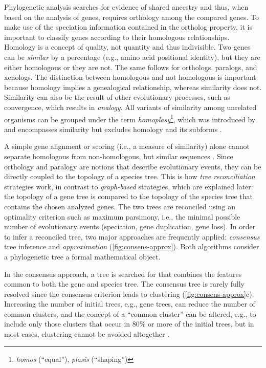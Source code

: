 Phylogenetic analysis searches for evidence of shared ancestry and thus, when
based on the analysis of genes, requires orthology among the compared genes. To
make use of the speciation information contained in the ortholog property, it is
important to classify genes according to their homologous relationships.
Homology is a concept of quality, not quantity \citep{reeck1987} and thus
indivisible. Two genes can be \emph{similar} by a percentage (e.g., amino acid
positional identity), but they are either homologous or they are not. The same
follows for orthologs, paralogs, and xenologs. The distinction between
homologous and not homologous is important because homology implies a
genealogical relationship, whereas similarity does not. Similarity can also be
the result of other evolutionary processes, such as convergence, which results
in \emph{analogy}. All variants of similarity among unrelated organisms can be
grouped under the term \emph{homoplasy}\footnote{\emph{homos} (``equal''),
\emph{plasis} (``shaping'')}, which was introduced by \citet{lankester1870} and
encompasses similarity but excludes homology and its subforms \citep{page1998}.

A simple gene alignment or scoring (i.e., a measure of similarity) alone cannot
separate homologous from non-homologous, but similar sequences
\citep{eisen1998}. Since orthology and paralogy are notions that describe
evolutionary events, they can be directly coupled to the topology of a species
tree. This is how \emph{tree reconciliation} strategies work, in contrast to
\emph{graph-based} strategies, which are explained later: the topology of a gene
tree is compared to the topology of the species tree that contains the chosen
analyzed genes. The two trees are reconciled using an optimality criterion such
as maximum parsimony, i.e., the minimal possible number of evolutionary events
(speciation, gene duplication, gene loss). In order to infer a reconciled tree,
two major approaches are frequently applied: \emph{consensus} tree inference and
\emph{approximation} (\autoref{fig:consens-approx}). Both algorithms consider a
phylogenetic tree a formal mathematical object.

In the consensus approach, a tree is searched for that combines the features
common to both the gene and species tree. The consensus tree is rarely fully
resolved since the consensus criterion leads to clustering
(\autoref{fig:consens-approx}c). Increasing the number of initial trees, e.g.,
gene trees, can reduce the number of common clusters, and the concept of a
``common cluster'' can be altered, e.g., to include only those clusters that
occur in 80\% or more of the initial trees, but in most cases, clustering cannot
be avoided altogether \citep{mirkin1995}.

